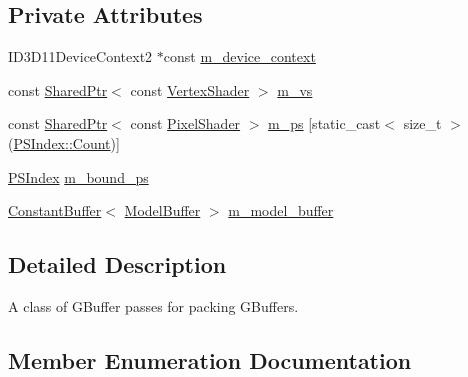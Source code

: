 \subsection*{Private Attributes}
\begin{DoxyCompactItemize}
\item 
I\+D3\+D11\+Device\+Context2 $\ast$const \hyperlink{classmage_1_1_g_buffer_pass_a009ffc6f7d459b4bda115cfb470e1fd0}{m\+\_\+device\+\_\+context}
\item 
const \hyperlink{namespacemage_a1e01ae66713838a7a67d30e44c67703e}{Shared\+Ptr}$<$ const \hyperlink{classmage_1_1_vertex_shader}{Vertex\+Shader} $>$ \hyperlink{classmage_1_1_g_buffer_pass_a5baced2ca3d5018e35d25d6c1b5d8f20}{m\+\_\+vs}
\item 
const \hyperlink{namespacemage_a1e01ae66713838a7a67d30e44c67703e}{Shared\+Ptr}$<$ const \hyperlink{namespacemage_a27ecaf266420ee7a494d64edc0757129}{Pixel\+Shader} $>$ \hyperlink{classmage_1_1_g_buffer_pass_ae607b9a6dab89d45865dc0ede3212fcd}{m\+\_\+ps} \mbox{[}static\+\_\+cast$<$ size\+\_\+t $>$(\hyperlink{classmage_1_1_g_buffer_pass_a1dbae3cb33d9c90ce7eb8c119d576379ae93f994f01c537c4e2f7d8528c3eb5e9}{P\+S\+Index\+::\+Count})\mbox{]}
\item 
\hyperlink{classmage_1_1_g_buffer_pass_a1dbae3cb33d9c90ce7eb8c119d576379}{P\+S\+Index} \hyperlink{classmage_1_1_g_buffer_pass_aef8452f64c9815d002e552957ed9e342}{m\+\_\+bound\+\_\+ps}
\item 
\hyperlink{structmage_1_1_constant_buffer}{Constant\+Buffer}$<$ \hyperlink{structmage_1_1_model_buffer}{Model\+Buffer} $>$ \hyperlink{classmage_1_1_g_buffer_pass_a0538769957df6740993dbb479b7e05a2}{m\+\_\+model\+\_\+buffer}
\end{DoxyCompactItemize}


\subsection{Detailed Description}
A class of G\+Buffer passes for packing G\+Buffers. 

\subsection{Member Enumeration Documentation}
\hypertarget{classmage_1_1_g_buffer_pass_a1dbae3cb33d9c90ce7eb8c119d576379}{}\label{classmage_1_1_g_buffer_pass_a1dbae3cb33d9c90ce7eb8c119d576379} 
